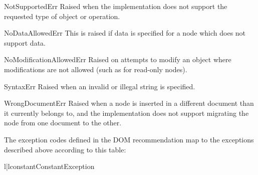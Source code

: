 \begin{excdesc}{NotSupportedErr}
  Raised when the implementation does not support the requested type
  of object or operation.
\end{excdesc}

\begin{excdesc}{NoDataAllowedErr}
  This is raised if data is specified for a node which does not
  support data.
\end{excdesc}

\begin{excdesc}{NoModificationAllowedErr}
  Raised on attempts to modify an object where modifications are not
  allowed (such as for read-only nodes).
\end{excdesc}

\begin{excdesc}{SyntaxErr}
  Raised when an invalid or illegal string is specified.
\end{excdesc}

\begin{excdesc}{WrongDocumentErr}
  Raised when a node is inserted in a different document than it
  currently belongs to, and the implementation does not support
  migrating the node from one document to the other.
\end{excdesc}

The exception codes defined in the DOM recommendation map to the
exceptions described above according to this table:

\begin{tableii}{l|l}{constant}{Constant}{Exception}
\end{tableii}


